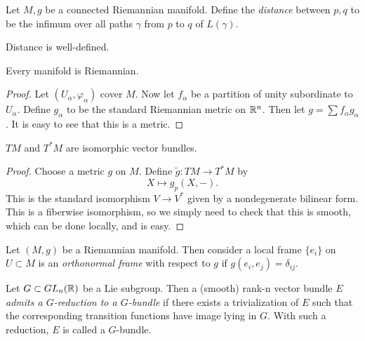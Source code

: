 \documentclass[twoside, 10pt]{article}
\begin{document}
    \begin{defn}
        Let $M,g$ be a connected Riemannian manifold. Define the \textit{distance} between $p,q$ to be the infimum over all paths $\gamma$ from $p$ to $q$ of $L(\gamma)$.
    \end{defn}

    \begin{prop}
        Distance is well-defined.
    \end{prop}

    \begin{prop}
        Every manifold is Riemannian.
    \end{prop}

    \begin{proof}
        Let $(U_{\alpha},\varphi_{\alpha})$ cover $M$. Now let $f_{\alpha}$ be a partition of unity subordinate to $U_{\alpha}$. Define $g_{\alpha}$ to be the standard Riemannian metric on $\mathbb{R}^n$. Then let $g = \sum f_{\alpha}g_{\alpha}$. It is easy to see that this is a metric.
    \end{proof}

    \begin{thm}
        $TM$ and $T^*M$ are isomorphic vector bundles.
    \end{thm}

    \begin{proof}
        Choose a metric $g$ on $M$. Define $\widetilde{g}:TM \to T^*M$ by 
        \[ X \mapsto g_p(X,-).\] This is the standard isomorphism $V \to V^*$ given by a nondegenerate bilinear form. This is a fiberwise isomorphism, so we simply need to check that this is smooth, which can be done locally, and is easy.
    \end{proof}

    \begin{defn}
        Let $(M,g)$ be a Riemannian manifold. Then consider a local frame $\{e_i\}$ on $U \subset M$ is an \textit{orthonormal frame} with respect to $g$ if $g(e_i,e_j) = \delta_{ij}$.
    \end{defn}

    \begin{defn}
        Let $G \subset GL_n(\mathbb{R})$ be a Lie subgroup. Then a (smooth) rank-n vector bundle $E$ \textit{admits a $G$-reduction to a $G$-bundle} if there exists a trivialization of $E$ such that the corresponding transition functions have image lying in $G$. With such a reduction, $E$ is called a $G$-bundle.
    \end{defn}
\end{document}
